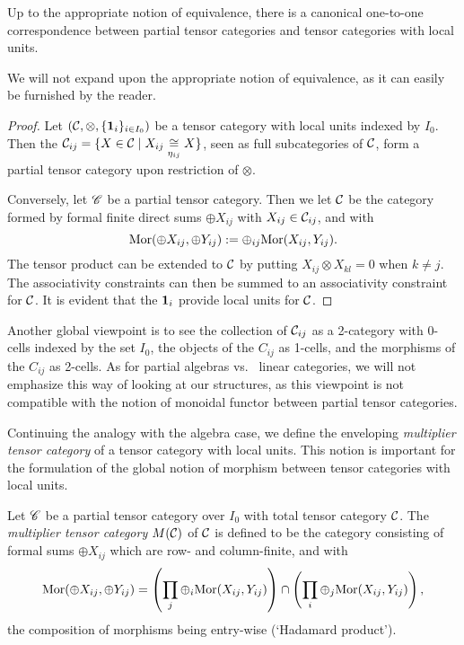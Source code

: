 \begin{Lem} Up to the appropriate notion of equivalence, there is a canonical one-to-one correspondence between partial tensor categories and tensor categories with local units. 
\end{Lem}

We will not expand upon the appropriate notion of equivalence, as it can easily be furnished by the reader. %

\begin{proof} Let $(\mathcal{C},\otimes,\{\mathbf{1}_i\}_{i\in I_0})$ be a tensor category with local units indexed by $I_0$. Then the $\mathcal{C}_{ij} = \{X \in \mathcal{C}\mid X_{ij} \underset{\eta_{ij}}{\cong} X\}$, seen as full subcategories of $\mathcal{C}$, form a partial tensor category upon restriction of $\otimes$.

Conversely, let $\mathscr{C}$ be a partial tensor category. Then we let $\mathcal{C}$ be the category formed by formal finite direct sums $\oplus X_{ij}$ with $X_{ij}\in \mathcal{C}_{ij}$, and with \[\mathrm{Mor}(\oplus X_{ij},\oplus Y_{ij}) := \oplus_{ij} \mathrm{Mor}(X_{ij},Y_{ij}).\] The tensor product can be extended to $\mathcal{C}$ by putting $X_{ij} \otimes X_{kl} = 0$ when $k\neq j$. The associativity constraints can then be summed to an associativity constraint for $\mathcal{C}$. It is evident that the $\mathbf{1}_i$ provide local units for $\mathcal{C}$. 
\end{proof}

\begin{Rem} Another global viewpoint is to see the collection of $\mathcal{C}_{ij}$ as a 2-category with 0-cells indexed by the set $I_0$, the objects of the $C_{ij}$ as 1-cells, and  the morphisms of the $C_{ij}$ as 2-cells. As for partial algebras vs.~ linear categories, we will not emphasize this way of looking at our structures, as this viewpoint is not compatible with the notion of monoidal functor between partial tensor categories.
\end{Rem} 

Continuing the analogy with the algebra case, we define the enveloping \emph{multiplier tensor category} of a tensor category with local units. This notion is important for the formulation of the global notion of morphism between tensor categories with local units. 

\begin{Def} Let $\mathscr{C}$ be a partial tensor category over $I_0$ with total tensor category $\mathcal{C}$. The \emph{multiplier tensor category} $M(\mathcal{C})$ of $\mathcal{C}$ is defined to be the category consisting of formal sums $\oplus X_{ij}$ which are row- and column-finite, and with \[\mathrm{Mor}(\oplus X_{ij},\oplus Y_{ij}) = \left(\prod_j\oplus_i  \mathrm{Mor}(X_{ij},Y_{ij}) \right) \cap \left(\prod_i\oplus_j \mathrm{Mor}(X_{ij},Y_{ij})\right),\] the composition of morphisms being entry-wise (`Hadamard product'). 
\end{Def}

